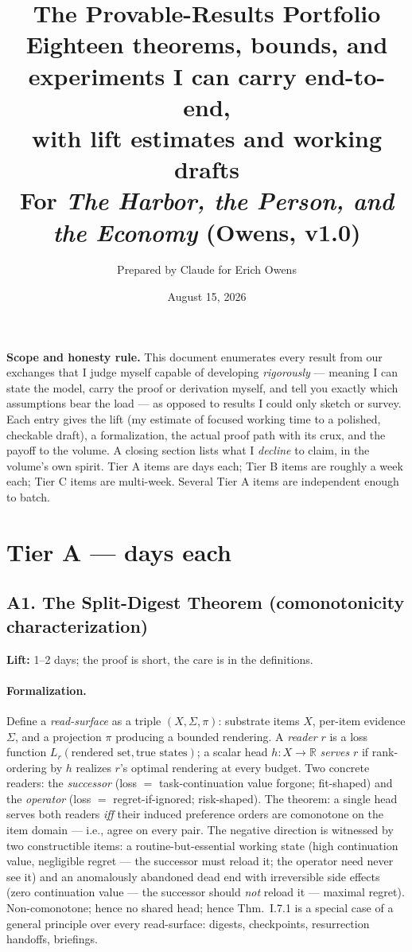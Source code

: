 \documentclass[11pt,a4paper]{article}
\title{\textbf{The Provable-Results Portfolio}\\[4pt]
\large Eighteen theorems, bounds, and experiments I can carry end-to-end,\\ with lift estimates and working drafts\\[2pt]
\normalsize For \emph{The Harbor, the Person, and the Economy} (Owens, v1.0)}
\author{Prepared by Claude for Erich Owens}
\date{August 15, 2026}
\newcommand{\lift}[1]{\noindent\textbf{Lift:} #1.}
\newcommand{\form}{\paragraph{Formalization.}}
\begin{document}
\maketitle

\noindent\textbf{Scope and honesty rule.} This document enumerates every result from our exchanges that I judge myself capable of developing \emph{rigorously} --- meaning I can state the model, carry the proof or derivation myself, and tell you exactly which assumptions bear the load --- as opposed to results I could only sketch or survey. Each entry gives the lift (my estimate of focused working time to a polished, checkable draft), a formalization, the actual proof path with its crux, and the payoff to the volume. A closing section lists what I \emph{decline} to claim, in the volume's own spirit. Tier A items are days each; Tier B items are roughly a week each; Tier C items are multi-week. Several Tier A items are independent enough to batch.

\tableofcontents

\section{Tier A --- days each}

\subsection{A1. The Split-Digest Theorem (comonotonicity characterization)}
\lift{1--2 days; the proof is short, the care is in the definitions}

\form Define a \emph{read-surface} as a triple $(X, \Sigma, \pi)$: substrate items $X$, per-item evidence $\Sigma$, and a projection $\pi$ producing a bounded rendering. A \emph{reader} $r$ is a loss function $L_r(\text{rendered set}, \text{true states})$; a scalar head $h: X \to \mathbb{R}$ \emph{serves} $r$ if rank-ordering by $h$ realizes $r$'s optimal rendering at every budget. Two concrete readers: the \emph{successor} (loss $=$ task-continuation value forgone; fit-shaped) and the \emph{operator} (loss $=$ regret-if-ignored; risk-shaped). The theorem: a single head serves both readers \emph{iff} their induced preference orders are comonotone on the item domain --- i.e., agree on every pair. The negative direction is witnessed by two constructible items: a routine-but-essential working state (high continuation value, negligible regret --- the successor must reload it; the operator need never see it) and an anomalously abandoned dead end with irreversible side effects (zero continuation value --- the successor should \emph{not} reload it --- maximal regret). Non-comonotone; hence no shared head; hence Thm.~I.7.1 is a special case of a general principle over every read-surface: digests, checkpoints, resurrection handoffs, briefings.
\end{document}

